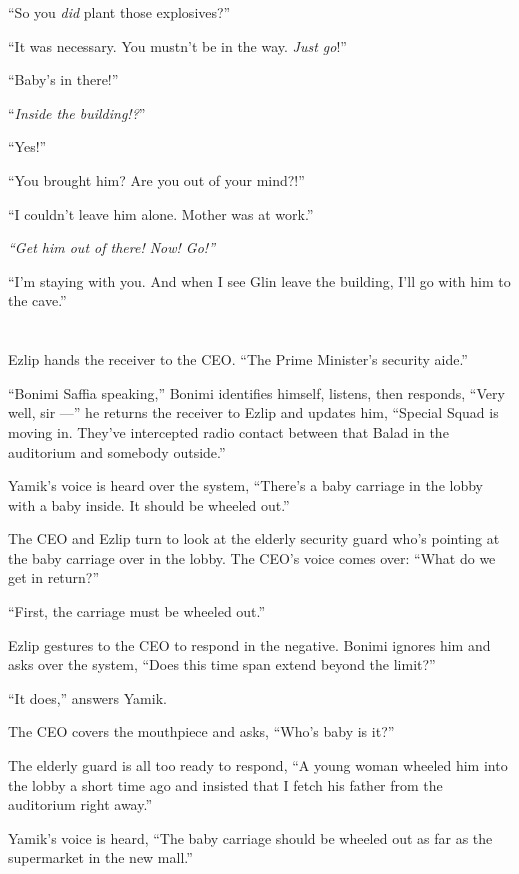 \documentclass[twoside,11pt,openany]{book}
\begin{document}
``So you \textit{did}{ }plant those explosives?''

``It was necessary.
You mustn't be in the way. \textit{Just go}!''

``Baby's in there!''

``\textit{Inside the  building!?}''

``Yes!''

``You brought him? Are you out of your mind?!''

``I couldn't leave him alone{. } Mother was at
work.''

\textit{``Get him out of there! Now! Go!'' }

``I'm staying with you. And when I see Glin leave the building, I'll go with him to the
cave.''



\chapter{}

Ezlip hands the receiver to the CEO. ``The Prime Minister's security aide.''

``Bonimi Saffia speaking,'' Bonimi identifies himself, listens, then responds,
``Very well, sir ---'' he returns the receiver to Ezlip and updates him, ``Special
Squad is moving in. They've intercepted radio contact between that Balad in the auditorium and somebody
outside.''

Yamik's voice is heard over the system, ``There's a baby carriage in the lobby with a baby inside. It
should be wheeled out.''

The CEO and Ezlip turn to look at the elderly security{ }guard who's pointing
at the baby carriage over in the lobby. The CEO's voice comes over: ``What do we get in
return?''

``First, the carriage must be wheeled out.''

Ezlip gestures to the CEO to respond in the negative. Bonimi ignores him and asks over the system, ``Does
this time span extend beyond the limit?''

``It does,'' answers Yamik{.}

The CEO covers the mouthpiece and asks, ``Who's baby is it?''

The elderly guard is all too ready to respond, ``A young{ }woman
wheeled him into the lobby a short time ago and insisted that I fetch his father from the auditorium right
away.''

Yamik's voice is heard, ``The baby carriage should be wheeled out as far as the supermarket in the new
mall.''
\end{document}
